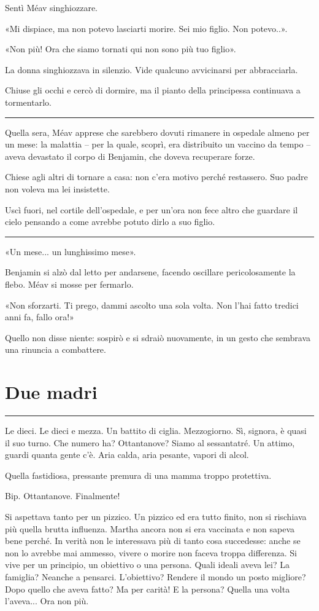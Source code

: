 \documentclass[a4paper,11pt,oneside,openright,final]{memoir}
\begin{document}
Sentì Méav singhiozzare.

«Mi dispiace, ma non potevo lasciarti morire. Sei mio figlio. Non potevo..».

«Non più! Ora che siamo tornati qui non sono più tuo figlio».

La donna singhiozzava in silenzio. Vide qualcuno avvicinarsi per abbracciarla.

Chiuse gli occhi e cercò di dormire, ma il pianto della principessa continuava
a tormentarlo.

\plainbreak{1}

Quella sera, Méav apprese che sarebbero dovuti rimanere in ospedale almeno per
un mese: la malattia -- per la quale, scoprì, era distribuito un vaccino da
tempo -- aveva devastato il corpo di Benjamin, che doveva recuperare forze.

Chiese agli altri di tornare a casa: non c'era motivo perché restassero. Suo
padre non voleva ma lei insistette.

Uscì fuori, nel cortile dell'ospedale, e per un'ora non fece altro che guardare
il cielo pensando a come avrebbe potuto dirlo a suo figlio.

\plainbreak{1}

«Un mese... un lunghissimo mese».

Benjamin si alzò dal letto per andarsene, facendo oscillare pericolosamente la
flebo. Méav si mosse per fermarlo.

«Non sforzarti. Ti prego, dammi ascolto una sola volta. Non l’hai fatto
tredici anni fa, fallo ora!»

Quello non disse niente: sospirò e si sdraiò nuovamente, in un gesto che
sembrava una rinuncia a combattere.

\chapter{Due madri}

\plainbreak{1}

Le dieci. Le dieci e mezza. Un battito di ciglia. Mezzogiorno. Sì, signora, è
quasi il suo turno. Che numero ha? Ottantanove? Siamo al sessantatré. Un
attimo, guardi quanta gente c’è. Aria calda, aria pesante, vapori di alcol.

Quella fastidiosa, pressante premura di una mamma troppo protettiva.

Bip. Ottantanove. Finalmente!

Si aspettava tanto per un pizzico. Un pizzico ed era tutto finito, non si
rischiava più quella brutta influenza. Martha ancora non si era vaccinata e non
sapeva bene perché. In verità non le interessava più di tanto cosa
succedesse: anche se non lo avrebbe mai ammesso, vivere o morire non faceva
troppa differenza. Si vive per un principio, un obiettivo o una persona. Quali
ideali aveva lei? La famiglia? Neanche a pensarci. L’obiettivo? Rendere il
mondo un posto migliore? Dopo quello che aveva fatto? Ma per carità! E la
persona? Quella una volta l’aveva... Ora non più.
\end{document}
